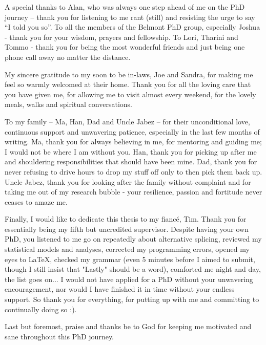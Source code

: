 A special thanks to Alan, who was always one step ahead of me on the PhD journey – thank you for listening to me rant (still) and resisting the urge to say “I told you so”. To all the members of the Belmont PhD group, especially Joshua - thank you for your wisdom, prayers and fellowship. To Lori, Tharini and Tommo - thank you for being the most wonderful friends and just being one phone call away no matter the distance. 

My sincere gratitude to my soon to be in-laws, Joe and Sandra, for making me feel so warmly welcomed at their home. Thank you for all the loving care that you have given me, for allowing me to visit almost every weekend, for the lovely meals, walks and spiritual conversations.
 
To my family – Ma, Han, Dad and Uncle Jabez – for their unconditional love, continuous support and unwavering patience, especially in the last few months of writing. Ma, thank you for always believing in me, for mentoring and guiding me; I would not be where I am without you. Han, thank you for picking up after me and shouldering responsibilities that should have been mine. Dad, thank you for never refusing to drive hours to drop my stuff off only to then pick them back up. Uncle Jabez, thank you for looking after the family without complaint and for taking me out of my research bubble - your resilience, passion and fortitude never ceases to amaze me.  

Finally, I would like to dedicate this thesis to my fiancé, Tim. Thank you for essentially being my fifth but uncredited supervisor. Despite having your own PhD, you listened to me go on repeatedly about alternative splicing, reviewed my statistical models and analyses, corrected my programming errors, opened my eyes to LaTeX, checked my grammar (even 5 minutes before I aimed to submit, though I still insist that "Lastly" should be a word), comforted me night and day, the list goes on... I would not have applied for a PhD without your unwavering encouragement, nor would I have finished it in time without your endless support. So thank you for everything, for putting up with me and committing to continually doing so :).

Last but foremost, praise and thanks be to God for keeping me motivated and sane throughout this PhD journey.

\endgroup